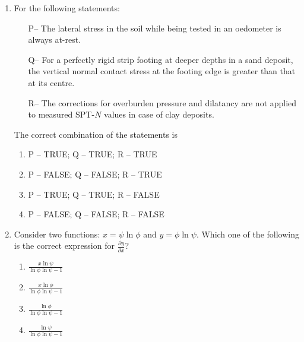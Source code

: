 \documentclass[12pt]{article}
\begin{document}
\begin{enumerate}[label= Q.\arabic*,start =26]
	\item For the following statements:

		\begin{itemize}
			\item[P--] The lateral stress in the soil while being tested in an oedometer is always at-rest.
			\item[Q--] For a perfectly rigid strip footing at deeper depths in a sand deposit, the vertical normal contact stress at the footing edge is greater than that at its centre.
			\item[R--] The corrections for overburden pressure and dilatancy are not applied to measured SPT-$N$ values in case of clay deposits.
		\end{itemize}

		The correct combination of the statements is

		\begin{enumerate}[label=(\Alph*)]
			\item P -- TRUE; \hspace{1mm} Q -- TRUE; \hspace{1mm} R -- TRUE
			\item P -- FALSE; \hspace{1mm} Q -- FALSE; \hspace{1mm} R -- TRUE
			\item P -- TRUE; \hspace{1mm} Q -- TRUE; \hspace{1mm} R -- FALSE
			\item P -- FALSE; \hspace{1mm} Q -- FALSE; \hspace{1mm} R -- FALSE
		\end{enumerate}

	\item Consider two functions: \( x = \psi \ln \phi \) and \( y = \phi \ln \psi \). Which one of the following is the correct expression for \( \frac{\partial y}{\partial x} \)?

		\begin{multicols}{4}
			\begin{enumerate}[label=(\Alph*)]
				\item \( \frac{x \ln \psi}{\ln \phi \ln \psi - 1} \)
				\item \( \frac{x \ln \phi}{\ln \phi \ln \psi - 1} \)
				\item \( \frac{\ln \phi}{\ln \phi \ln \psi - 1} \)
				\item \( \frac{\ln \psi}{\ln \phi \ln \psi - 1} \)
			\end{enumerate}
		\end{multicols}


\end{enumerate}
\end{document}

